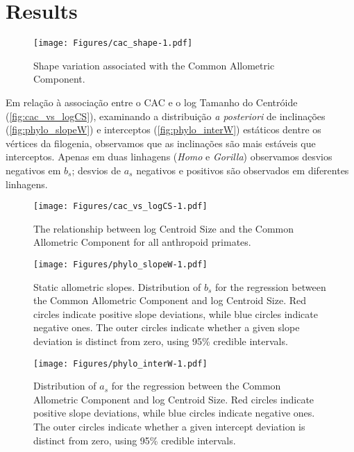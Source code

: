 \documentclass[12pt,]{article}
\begin{document}
\section{Results}\label{results}

\begin{figure}[htbp]
\centering
\texttt{[image: Figures/cac\_shape-1.pdf]}
\caption{Shape variation associated with the Common Allometric
Component. \label{fig:cac_shape}}
\end{figure}



Em relação à associação entre o CAC e o log Tamanho do Centróide
(\autoref{fig:cac_vs_logCS}), examinando a distribuição \emph{a
posteriori} de inclinações (\autoref{fig:phylo_slopeW}) e interceptos
(\autoref{fig:phylo_interW}) estáticos dentre os vértices da filogenia,
observamos que as inclinações são mais estáveis que interceptos. Apenas
em duas linhagens (\emph{Homo} e \emph{Gorilla}) observamos desvios
negativos em $b_s$; desvios de $a_s$ negativos e positivos são
observados em diferentes linhagens.

\begin{figure}[htbp]
\centering
\texttt{[image: Figures/cac\_vs\_logCS-1.pdf]}
\caption{The relationship between log Centroid Size and the Common
Allometric Component for all anthropoid primates.
\label{fig:cac_vs_logCS}}
\end{figure}

\begin{figure}[htbp]
\centering
\texttt{[image: Figures/phylo\_slopeW-1.pdf]}
\caption{Static allometric slopes. Distribution of $b_s$ for the
regression between the Common Allometric Component and log Centroid
Size. Red circles indicate positive slope deviations, while blue circles
indicate negative ones. The outer circles indicate whether a given slope
deviation is distinct from zero, using 95\% credible intervals.
\label{fig:phylo_slopeW}}
\end{figure}

\begin{figure}[htbp]
\centering
\texttt{[image: Figures/phylo\_interW-1.pdf]}
\caption{Distribution of $a_s$ for the regression between the Common
Allometric Component and log Centroid Size. Red circles indicate
positive slope deviations, while blue circles indicate negative ones.
The outer circles indicate whether a given intercept deviation is
distinct from zero, using 95\% credible intervals.
\label{fig:phylo_interW}}
\end{figure}
\end{document}
